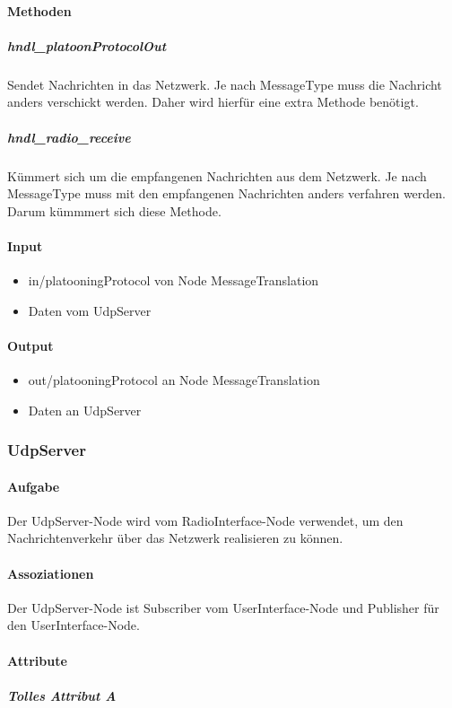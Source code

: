 \documentclass[a4paper, 12pt, titlepage]{scrartcl}
\begin{document}
				\paragraph{Methoden}
				    \subparagraph{hndl\_platoonProtocolOut} Sendet Nachrichten in das Netzwerk. Je nach MessageType muss die Nachricht anders verschickt werden. Daher wird hierfür eine extra Methode benötigt. 
					\subparagraph{hndl\_radio\_receive} Kümmert sich um die empfangenen Nachrichten aus dem Netzwerk. Je nach MessageType muss mit den empfangenen Nachrichten anders verfahren werden. Darum kümmmert sich diese Methode. 
				\paragraph{Input} 
				    \begin{itemize}
				        \item in/platooningProtocol von Node MessageTranslation
				        \item Daten vom UdpServer
				    \end{itemize}
				\paragraph{Output}
				    \begin{itemize}
				        \item out/platooningProtocol an Node MessageTranslation
				        \item Daten an UdpServer
				    \end{itemize}
				
		    \subsubsection{UdpServer}
			\label{udpserver}
				\paragraph{Aufgabe} Der UdpServer-Node wird vom RadioInterface-Node verwendet, um den Nachrichtenverkehr über das Netzwerk realisieren zu können. 
				\paragraph{Assoziationen} Der UdpServer-Node ist Subscriber vom UserInterface-Node und Publisher für den UserInterface-Node. 
				\paragraph{Attribute}
					\subparagraph{Tolles Attribut A}
\end{document}
